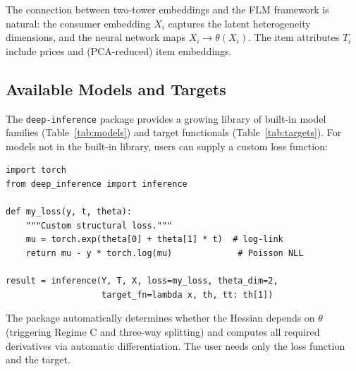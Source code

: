 The connection between two-tower embeddings and the FLM framework is natural: the consumer embedding $X_i$ captures the latent heterogeneity dimensions, and the neural network maps $X_i \to \theta(X_i)$. The item attributes $T_i$ include prices and (PCA-reduced) item embeddings.

\subsection{Available Models and Targets}

The \texttt{deep-inference} package provides a growing library of built-in model families (Table~\ref{tab:models}) and target functionals (Table~\ref{tab:targets}). For models not in the built-in library, users can supply a custom loss function:

\begin{lstlisting}
import torch
from deep_inference import inference

def my_loss(y, t, theta):
    """Custom structural loss."""
    mu = torch.exp(theta[0] + theta[1] * t)  # log-link
    return mu - y * torch.log(mu)             # Poisson NLL

result = inference(Y, T, X, loss=my_loss, theta_dim=2,
                   target_fn=lambda x, th, tt: th[1])
\end{lstlisting}

The package automatically determines whether the Hessian depends on $\theta$ (triggering Regime C and three-way splitting) and computes all required derivatives via automatic differentiation. The user needs only the loss function and the target.
